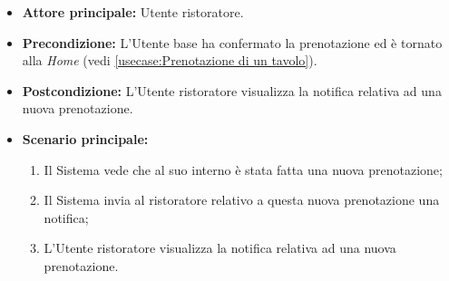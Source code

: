\label{usecase:Visualizzazione notifica prenotazione}
\begin{itemize}
	\item \textbf{Attore principale:} Utente ristoratore.
	
	\item \textbf{Precondizione:} L'Utente base ha confermato la prenotazione ed è tornato alla \textit{Home} (vedi \autoref{usecase:Prenotazione di un tavolo}).

	\item \textbf{Postcondizione:} L'Utente ristoratore visualizza la notifica relativa ad una nuova prenotazione.
     
	\item \textbf{Scenario principale:}
	      \begin{enumerate}
                \item Il Sistema vede che al suo interno è stata fatta una nuova prenotazione;
                \item Il Sistema invia al ristoratore relativo a questa nuova prenotazione una notifica;
                \item L'Utente ristoratore visualizza la notifica relativa ad una nuova prenotazione.
	      \end{enumerate}
\end{itemize}